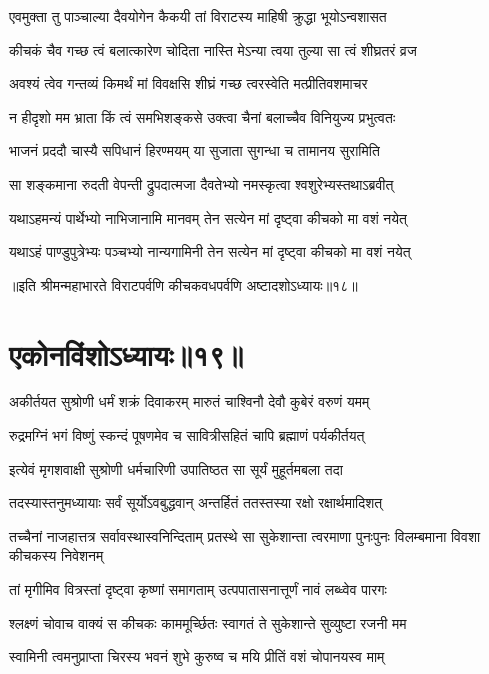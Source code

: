 \twolineshloka
{एवमुक्ता तु पाञ्चाल्या दैवयोगेन कैकयी}
{तां विराटस्य माहिषी क्रुद्धा भूयोऽन्वशासत}


\twolineshloka
{कीचकं चैव गच्छ त्वं बलात्कारेण चोदिता}
{नास्ति मेऽन्या त्वया तुल्या सा त्वं शीघ्रतरं व्रज}


\twolineshloka
{अवश्यं त्वेव गन्तव्यं किमर्थं मां विवक्षसि}
{शीघ्रं गच्छ त्वरस्वेति मत्प्रीतिवशमाचर}


\twolineshloka
{न हीदृशो मम भ्राता किं त्वं समभिशङ्कसे}
{उक्त्वा चैनां बलाच्चैव विनियुज्य प्रभुत्वतः}


\twolineshloka
{भाजनं प्रददौ चास्यै सपिधानं हिरण्मयम्}
{या सुजाता सुगन्धा च तामानय सुरामिति}


\twolineshloka
{सा शङ्कमाना रुदती वेपन्ती द्रुपदात्मजा}
{दैवतेभ्यो नमस्कृत्वा श्वशुरेभ्यस्तथाऽब्रवीत्}


\twolineshloka
{यथाऽहमन्यं पार्थेभ्यो नाभिजानामि मानवम्}
{तेन सत्येन मां दृष्ट्वा कीचको मा वशं नयेत्}


\twolineshloka
{यथाऽहं पाण्डुपुत्रेभ्यः पञ्चभ्यो नान्यगामिनी}
{तेन सत्येन मां दृष्ट्वा कीचको मा वशं नयेत्}

॥इति श्रीमन्महाभारते विराटपर्वणि कीचकवधपर्वणि अष्टादशोऽध्यायः॥१८॥

\chapter{एकोनविंशोऽध्यायः॥१९॥}

\twolineshloka
{अकीर्तयत सुश्रोणी धर्मं शक्रं दिवाकरम्}
{मारुतं चाश्विनौ देवौ कुबेरं वरुणं यमम्}


\twolineshloka
{रुद्रमग्निं भगं विष्णुं स्कन्दं पूषणमेव च}
{सावित्रीसहितं चापि ब्रह्माणं पर्यकीर्तयत्}


\twolineshloka
{इत्येवं मृगशवाक्षी सुश्रोणी धर्मचारिणी}
{उपातिष्ठत सा सूर्यं मुहूर्तमबला तदा}


\twolineshloka
{तदस्यास्तनुमध्यायाः सर्वं सूर्योऽवबुद्धवान्}
{अन्तर्हितं ततस्तस्या रक्षो रक्षार्थमादिशत्}


\onelineshloka
{तच्चैनां नाजहात्तत्र सर्वावस्थास्वनिन्दिताम्}
\twolineshloka
{प्रतस्थे सा सुकेशान्ता त्वरमाणा पुनःपुनः}
{विलम्बमाना विवशा कीचकस्य निवेशनम्}


\twolineshloka
{तां मृगीमिव वित्रस्तां दृष्ट्वा कृष्णां समागताम्}
{उत्पपातासनात्तूर्णं नावं लब्ध्वेव पारगः}


\twolineshloka
{श्लक्ष्णं चोवाच वाक्यं स कीचकः काममूर्च्छितः}
{स्वागतं ते सुकेशान्ते सुव्युष्टा रजनी मम}


\twolineshloka
{स्वामिनी त्वमनुप्राप्ता चिरस्य भवनं शुभे}
{कुरुष्व च मयि प्रीतिं वशं चोपानयस्व माम्}


